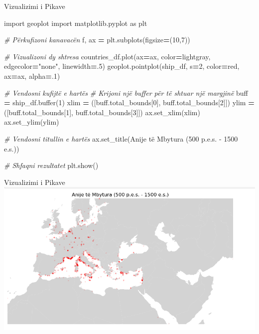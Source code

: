 \documentclass[
  ignorenonframetext,
]{beamer}
\newenvironment{Shaded}{\begin{snugshade}}{\end{snugshade}}
\newcommand{\BuiltInTok}[1]{#1}
\newcommand{\CommentTok}[1]{\textcolor[rgb]{0.56,0.35,0.01}{\textit{#1}}}
\newcommand{\DecValTok}[1]{\textcolor[rgb]{0.00,0.00,0.81}{#1}}
\newcommand{\FloatTok}[1]{\textcolor[rgb]{0.00,0.00,0.81}{#1}}
\newcommand{\ImportTok}[1]{#1}
\newcommand{\NormalTok}[1]{#1}
\newcommand{\OperatorTok}[1]{\textcolor[rgb]{0.81,0.36,0.00}{\textbf{#1}}}
\newcommand{\StringTok}[1]{\textcolor[rgb]{0.31,0.60,0.02}{#1}}
\begin{document}
\begin{frame}[fragile]{Vizualizimi i Pikave}
\protect\hypertarget{vizualizimi-i-pikave}{}

\begin{Shaded}
\begin{Highlighting}[]
\ImportTok{import}\NormalTok{ geoplot}
\ImportTok{import}\NormalTok{ matplotlib.pyplot }\ImportTok{as}\NormalTok{ plt}

\CommentTok{\# Përkufizoni kanavacën}
\NormalTok{f, ax }\OperatorTok{=}\NormalTok{ plt.subplots(figsize}\OperatorTok{=}\NormalTok{(}\DecValTok{10}\NormalTok{,}\DecValTok{7}\NormalTok{))}

\CommentTok{\# Vizualizoni dy shtresa}
\NormalTok{countries\_df.plot(ax}\OperatorTok{=}\NormalTok{ax, color}\OperatorTok{=}\StringTok{\textquotesingle{}lightgray\textquotesingle{}}\NormalTok{, edgecolor}\OperatorTok{=}\StringTok{"none"}\NormalTok{, linewidth}\OperatorTok{=}\FloatTok{.5}\NormalTok{)}
\NormalTok{geoplot.pointplot(ship\_df, s}\OperatorTok{=}\DecValTok{2}\NormalTok{, color}\OperatorTok{=}\StringTok{\textquotesingle{}red\textquotesingle{}}\NormalTok{, ax}\OperatorTok{=}\NormalTok{ax, alpha}\OperatorTok{=}\FloatTok{.1}\NormalTok{)}

\CommentTok{\# Vendosni kufijtë e hartës}
\CommentTok{\# Krijoni një buffer për të shtuar një margjinë}
\NormalTok{buff }\OperatorTok{=}\NormalTok{ ship\_df.}\BuiltInTok{buffer}\NormalTok{(}\DecValTok{1}\NormalTok{)}
\NormalTok{xlim }\OperatorTok{=}\NormalTok{ ([buff.total\_bounds[}\DecValTok{0}\NormalTok{], buff.total\_bounds[}\DecValTok{2}\NormalTok{]])}
\NormalTok{ylim }\OperatorTok{=}\NormalTok{ ([buff.total\_bounds[}\DecValTok{1}\NormalTok{], buff.total\_bounds[}\DecValTok{3}\NormalTok{]])}
\NormalTok{ax.set\_xlim(xlim)}
\NormalTok{ax.set\_ylim(ylim)}

\CommentTok{\# Vendosni titullin e hartës}
\NormalTok{ax.set\_title(}\StringTok{\textquotesingle{}Anije të Mbytura (500 p.e.s. {-} 1500 e.s.)\textquotesingle{}}\NormalTok{)}

\CommentTok{\# Shfaqni rezultatet}
\NormalTok{plt.show()}
\end{Highlighting}
\end{Shaded}
\end{frame}

\begin{frame}{Vizualizimi i Pikave}
\protect\hypertarget{vizualizimi-i-pikave-1}{}
\includegraphics{./Figs/anije.png}
\end{frame}
\end{document}
